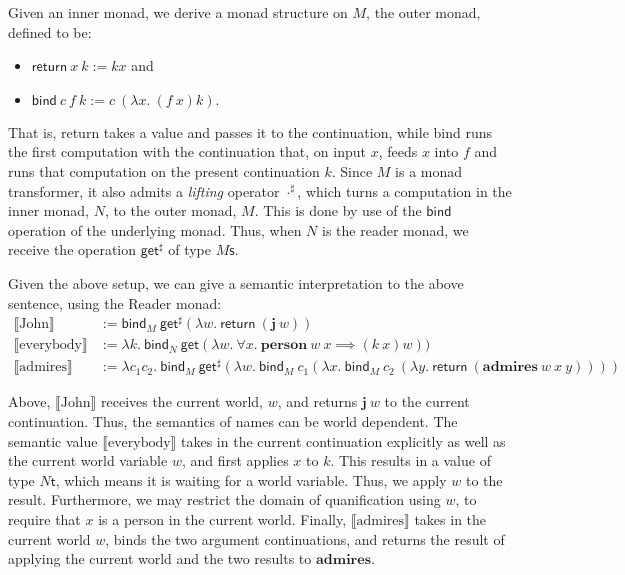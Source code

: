 \documentclass{article}
\newcommand{\Tt}{\textsf{t}}
\newcommand{\Ts}{\textsf{s}}
\newcommand{\sem}[1]{$\llbracket \text{#1} \rrbracket$}
\begin{document}
Given an inner monad, we derive a monad structure on $M$, the outer monad, defined to be:
\begin{itemize}
    \item $\textsf{return}\ x\ k := k x$ and
    \item $\textsf{bind}\ c\ f\ k := c\ (\lambda x.\ (f\ x) k).$
\end{itemize}

That is, \textsf{return} takes a value and passes it to the continuation, while \textsf{bind} runs the first computation with the continuation that, on input $x$, feeds $x$ into $f$ and runs that computation on the present continuation $k$. Since $M$ is a monad transformer, it also admits a \emph{lifting} operator $\cdot^\sharp$, which turns a computation in the inner monad, $N$, to the outer monad, $M$. This is done by use of the $\textsf{bind}$ operation of the underlying monad. Thus, when $N$ is the reader monad, we receive the operation $\textsf{get}^\sharp$ of type $M \Ts$.

Given the above setup, we can give a semantic interpretation to the above sentence, using the Reader monad:
\begin{align*}
    \llbracket \text{John} \rrbracket &:= \textsf{bind}_M\ \textsf{get}^\sharp (\lambda w.\ \textsf{return}\ (\mathbf{j}\ w)) \\
    \llbracket \text{everybody} \rrbracket &:= \lambda k.\ \textsf{bind}_N\ \textsf{get} (\lambda w.\ \forall x.\ \mathbf{person}\ w\ x \implies (k\ x) w)) \\
    \llbracket \text{admires} \rrbracket &:= \lambda c_1 c_2.\ \textsf{bind}_M\ \textsf{get}^\sharp (\lambda w.\ \textsf{bind}_M\ c_1 (\lambda x.\ \textsf{bind}_M\ c_2\ (\lambda y.\ \textsf{return}\ (\mathbf{admires}\ w\ x\ y))))
\end{align*}

Above, \sem{John} receives the current world, $w$, and returns $\mathbf{j}\ w$ to the current continuation. Thus, the semantics of names can be world dependent. The semantic value \sem{everybody} takes in the current continuation explicitly as well as the current world variable $w$, and first applies $x$ to $k$. This results in a value of type $N \Tt$, which means it is waiting for a world variable. Thus, we apply $w$ to the result. Furthermore, we may restrict the domain of quanification using $w$, to require that $x$ is a person in the current world. Finally, \sem{admires} takes in the current world $w$, binds the two argument continuations, and returns the result of applying the current world and the two results to $\mathbf{admires}$.
\end{document}
